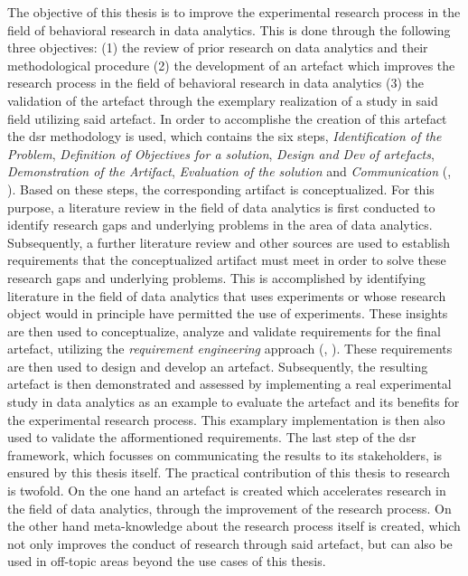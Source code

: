 The objective of this thesis is to improve the experimental research process in the field of behavioral research in data analytics. This is done through the following three objectives: (1) the review of prior research on data analytics and their methodological procedure (2) the development of an artefact which improves the research process in the field of behavioral research in data analytics (3) the validation of the artefact through the exemplary realization of a study in said field utilizing said artefact. In order to accomplishe the creation of this artefact the \acf{dsr} methodology is used, which contains the six steps, \textit{Identification of the Problem}, \textit{Definition of Objectives for a solution}, \textit{Design and Dev of artefacts}, \textit{Demonstration of the Artifact}, \textit{Evaluation of the solution} and \textit{Communication} (\cite{Peffers.2006}, \cite{Dresch.2015}). Based on these steps, the corresponding artifact is conceptualized. For this purpose, a literature review in the field of data analytics is first conducted to identify research gaps and underlying problems in the area of data analytics. Subsequently, a further literature review and other sources are used to establish requirements that the conceptualized artifact must meet in order to solve these research gaps and underlying problems. This is accomplished by identifying literature in the field of data analytics that uses experiments or whose research object would in principle have permitted the use of experiments. These insights are then used to conceptualize, analyze and validate requirements for the final artefact, utilizing the \textit{requirement engineering} approach (\cite{Sommerville.2011}, \cite{SWEBOK.2004}). These requirements are then used to design and develop an artefact. Subsequently, the resulting artefact is then demonstrated and assessed by implementing a real experimental study in data analytics as an example to evaluate the artefact and its benefits for the experimental research process. This examplary implementation is then also used to validate the afformentioned requirements. The last step of the \ac{dsr} framework, which focusses on communicating the results to its stakeholders, is ensured by this thesis itself. The practical contribution of this thesis to research is twofold. On the one hand an artefact is created which accelerates research in the field of data analytics, through the improvement of the research process. On the other hand meta-knowledge about the research process itself is created, which not only improves the conduct of research through said artefact, but can also be used in off-topic areas beyond the use cases of this thesis.


